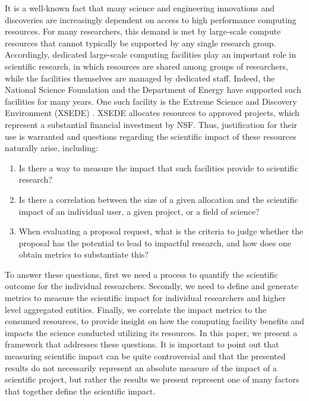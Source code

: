 \documentclass{sig-alternate}
\begin{document}
It is a well-known fact that many science and engineering innovations and discoveries are increasingly dependent on access to high performance computing resources. For many researchers, this demand is met by large-scale compute resources that cannot typically be supported by any single research group. Accordingly, dedicated large-scale computing facilities play an important role in scientific research, in which resources are shared among groups of researchers, while the facilities themselves are managed by dedicated staff. Indeed, the National Science Foundation and the Department of Energy have supported such facilities for many years. One such facility is the Extreme Science and Discovery Environment (XSEDE) \cite{www-xsede}. XSEDE allocates resources to approved projects, which represent a substantial financial investment by NSF. Thus, justification for their use is warranted and questions regarding the scientific impact of these resources naturally arise, including:

\begin{enumerate}

\item Is there a way to measure the impact that such facilities provide to scientific research?

 \item Is there a correlation between the size of a given allocation and the scientific impact of an individual user, a given project, or a field of science?

\item When evaluating a proposal request, what is the criteria to judge whether the proposal has the potential to lead to impactful research, and how does one obtain metrics to substantiate this?

\end{enumerate} 

To answer these questions, first we need a process to quantify the scientific outcome for the individual researchers. Secondly, we need to define and generate metrics to measure the scientific impact for individual researchers and higher level aggregated entities. Finally, we correlate the impact metrics to the consumed resources, to provide insight on how the computing facility benefits and impacts the science conducted utilizing its resources. In this paper, we present a framework that addresses these questions. It is important to point out that measuring scientific impact can be quite controversial and that the presented results do not necessarily represent an absolute measure of the impact of a scientific project, but rather the results we present represent one of many factors that together define the scientific impact.
\end{document}

